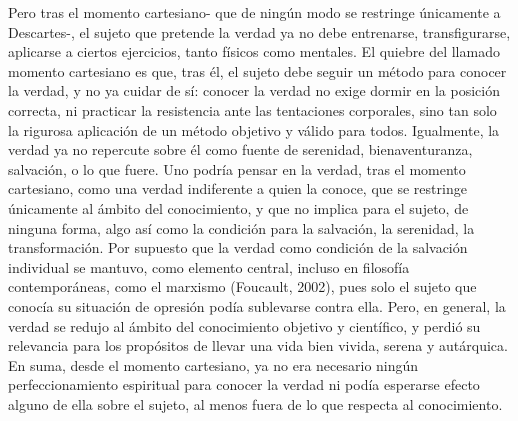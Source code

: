 \begin{refsection}
Pero tras el momento cartesiano- que de ningún modo se restringe únicamente a Descartes-, el sujeto que pretende la verdad ya no debe entrenarse, transfigurarse, aplicarse a ciertos ejercicios, tanto físicos como mentales. El quiebre del llamado momento cartesiano es que, tras él, el sujeto debe seguir un método para conocer la verdad, y no ya cuidar de sí: conocer la verdad no exige dormir en la posición correcta, ni practicar la resistencia ante las tentaciones corporales, sino tan solo la rigurosa aplicación de un método objetivo y válido para todos. Igualmente, la verdad ya no repercute sobre él como fuente de serenidad, bienaventuranza, salvación, o lo que fuere. Uno podría pensar en la verdad, tras el momento cartesiano, como una verdad indiferente a quien la conoce, que se restringe únicamente al ámbito del conocimiento, y que no implica para el sujeto, de ninguna forma, algo así como la condición para la salvación, la serenidad, la transformación. Por supuesto que la verdad como condición de la salvación individual se mantuvo, como elemento central, incluso en filosofía contemporáneas, como el marxismo (Foucault, 2002), pues solo el sujeto que conocía su situación de opresión podía sublevarse contra ella. Pero, en general, la verdad se redujo al ámbito del conocimiento objetivo y científico, y perdió su relevancia para los propósitos de llevar una vida bien vivida, serena y autárquica. En suma, desde el momento cartesiano, ya no era necesario ningún perfeccionamiento espiritual para conocer la verdad ni podía esperarse efecto alguno de ella sobre el sujeto, al menos fuera de lo que respecta al conocimiento.


\end{refsection}
